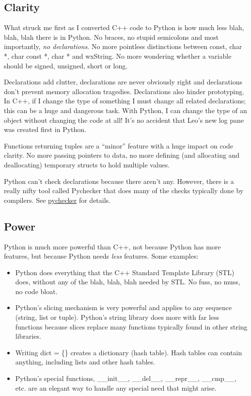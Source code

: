 \documentclass[a4paper,10pt,english]{sphinxmanual}
\begin{document}
\subsection{Clarity}
\label{whitepapers:clarity}
What struck me first as I converted C++ code to Python is how much less blah,
blah, blah there is in Python. No braces, no stupid semicolons and most
importantly, \emph{no declarations}. No more pointless distinctions between
const, char *, char const *, char * and wxString.
No more wondering whether a variable should be signed, unsigned, short or long.

Declarations add clutter, declarations are never obviously right and
declarations don't prevent memory allocation tragedies. Declarations also hinder
prototyping. In C++, if I change the type of something I must change all related
declarations; this can be a huge and dangerous task. With Python, I can change
the type of an object without changing the code at all! It's no accident that
Leo's new log pane was created first in Python.

Functions returning tuples are a ``minor'' feature with a huge impact on code
clarity. No more passing pointers to data, no more defining (and allocating and
deallocating) temporary structs to hold multiple values.

Python can't check declarations because there aren't any. However, there is a
really nifty tool called Pychecker that does many of the checks typically done
by compilers. See \href{http://pychecker.sourceforge.net/}{pychecker} for details.


\subsection{Power}
\label{whitepapers:power}
Python is much more powerful than C++, not because Python has more features, but
because Python needs \emph{less} features. Some examples:
\begin{itemize}
\item {} 
Python does everything that the C++ Standard Template Library (STL) does,
without any of the blah, blah, blah needed by STL.
No fuss, no muss, no code bloat.

\item {} 
Python's slicing mechanism is very powerful and applies to any sequence (string, list or tuple).
Python's string library does more with far less functions because slices replace many functions
typically found in other string libraries.

\item {} 
Writing dict = \{\} creates a dictionary (hash table).
Hash tables can contain anything, including lists and other hash tables.

\item {} 
Python's special functions,  \_\_init\_\_, \_\_del\_\_, \_\_repr\_\_, \_\_cmp\_\_, etc.
are an elegant way to handle any special need that might arise.

\end{itemize}
\end{document}
